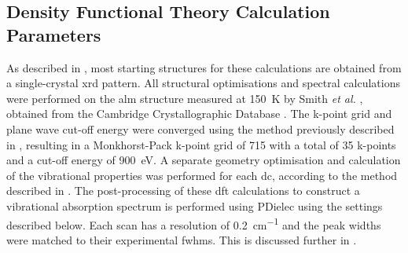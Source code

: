 \subsection{Density Functional Theory Calculation Parameters}
As described in , most starting structures for these calculations are obtained from a single\nobreakdash-crystal \acrshort{xrd} pattern. All structural optimisations and spectral calculations were performed on the \acrshort{alm} structure measured at \SI{150}{K} by Smith \textit{et al.} \cite{Smith2005}, obtained from the Cambridge Crystallographic Database \cite{Groom2016}. The k\nobreakdash-point grid and plane wave cut-off energy were converged using the method previously described in , resulting in a Monkhorst\nobreakdash-Pack k\nobreakdash-point grid of 715 with a total of 35 k\nobreakdash-points and a cut\nobreakdash-off energy of \SI{900}{eV}. A separate geometry optimisation and calculation of the vibrational properties was performed for each \acrshort{dc}, according to the method described in . The post\nobreakdash-processing of these \acrshort{dft} calculations to construct a vibrational absorption spectrum is performed using PDielec \cite{Kendrick2016} using the settings described below. Each scan has a resolution of \SI{0.2}{cm^{-1}} and the peak widths were matched to their experimental \acrshort{fwhm}s. This is discussed further in . 

